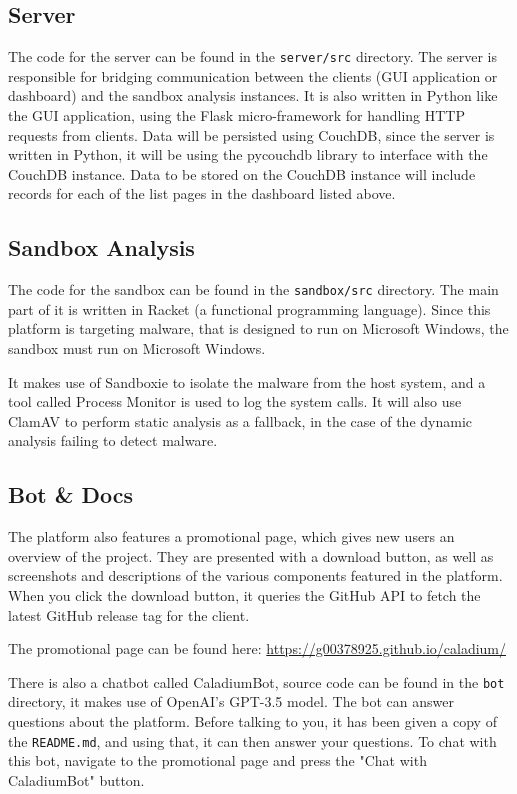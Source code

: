 \subsection{Server}
The code for the server can be found in the \texttt{server/src} directory.
The server is responsible for bridging communication between
the clients (GUI application or dashboard) and the sandbox analysis instances.
It is also written in Python like the GUI application,
using the Flask micro-framework for handling HTTP requests from clients.
Data will be persisted using CouchDB, since the server is written in Python,
it will be using the pycouchdb library to interface with the CouchDB instance.
Data to be stored on the CouchDB instance will include records for
each of the list pages in the dashboard listed above.

\subsection{Sandbox Analysis}
The code for the sandbox can be found in the \texttt{sandbox/src} directory.
The main part of it is written in Racket (a functional programming language).
Since this platform is targeting malware, that is designed to
run on Microsoft Windows, the sandbox must run on Microsoft Windows.

It makes use of Sandboxie to isolate the malware from the host system,
and a tool called Process Monitor is used to log the system calls.
It will also use ClamAV to perform static analysis as a fallback,
in the case of the dynamic analysis failing to detect malware.

\subsection{Bot \& Docs}
The platform also features a promotional page,
which gives new users an overview of the project.
They are presented with a download button,
as well as screenshots and descriptions of
the various components featured in the platform.
When you click the download button,
it queries the GitHub API to fetch the latest
GitHub release tag for the client.

The promotional page can be found here:
\href{https://g00378925.github.io/caladium/}{https://g00378925.github.io/caladium/}

There is also a chatbot called CaladiumBot, source code can be found in the
\texttt{bot} directory, it makes use of OpenAI's GPT-3.5 model. \cite{openai}
The bot can answer questions about the platform.
Before talking to you, it has been given a copy of the \texttt{README.md},
and using that, it can then answer your questions.
To chat with this bot, navigate to the promotional page and press the
"Chat with CaladiumBot" button.

